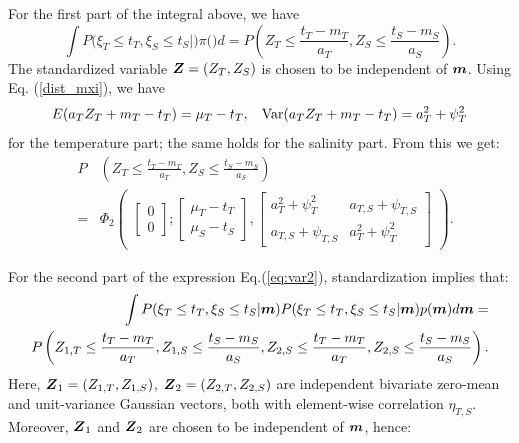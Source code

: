 \documentclass[aoas]{imsart}
\begin{document}
For the first part of the integral above, we have
\begin{equation}\label{part1:phi2}
 \int P(\xi_T \leq t_T, \xi_S \leq t_S|\bm) \pi(\bm) d\bm= 
P \left( Z_{T} \leq \frac{t_T-m_{T}}{a_{T}}, 
Z_{S} \leq \frac{t_S-m_{S}}{a_{S}} \right). \nonumber
\end{equation}
The standardized variable ${\boldsymbol Z}=(Z_{T},Z_{S})$ is chosen to be independent of ${\boldsymbol m}$. Using Eq. (\ref{dist_mxi}), we have
\begin{equation}
    E(a_{T} Z_{T}+m_{T}-t_T) = \mu_{T}-t_T, \hspace{3mm}
    \mbox{Var}(a_{T} Z_{T}+m_{T}-t_T) = a^2_T+ \psi^2_{T} 
\end{equation}
for the temperature part; the same holds for the salinity part. From this we get:
\begin{eqnarray}\label{two_parts0}
& P & \left( Z_{T} \leq \frac{t_T-m_{T}}{a_{T}}, 
Z_{S} \leq \frac{t_S-m_{S}}{a_{S}} \right) \\
&=& \Phi_2 \begin{pmatrix} 
\begin{bmatrix} 0\\
0
\end{bmatrix};
\begin{bmatrix} \mu_{T}-t_T\\
\mu_{S}-t_S
\end{bmatrix},\begin{bmatrix}
a^2_T+ \psi^2_{T} & a_{T,S}+\psi_{T,S}  \\
a_{T,S}+\psi_{T,S}   & a^2_T+ \psi^2_{T} 
\end{bmatrix}\end{pmatrix} \nonumber.
\end{eqnarray}

For the second part of the expression Eq.(\ref{eq:var2}), standardization
implies that: 
\begin{eqnarray}\label{part1:phi4}
&& \hspace{6mm} \int P(\xi_T \leq t_T, \xi_S \leq t_S|\bm) P(\xi_T \leq t_T, \xi_S \leq t_S|\bm) p(\bm) d\bm =  \\
&P& \hspace{-3mm} \left( Z_{1,T} \leq \frac{t_T-m_{T}}{a_{T}}, 
Z_{1,S} \leq \frac{t_S-m_{S}}{a_{S}},Z_{2,S} \leq \frac{t_T-m_{T}}{a_{T}}, 
Z_{2,S} \leq \frac{t_S-m_{S}}{a_{S}} \right). \nonumber
\end{eqnarray}
Here, ${\boldsymbol Z}_1=(Z_{1,T},Z_{1,S})$, ${\boldsymbol Z}_2=(Z_{2,T},Z_{2,S})$ are
independent bivariate zero-mean and unit-variance Gaussian vectors,
both with element-wise correlation $\eta_{T,S}$. Moreover, ${\boldsymbol Z}_1$ and
${\boldsymbol Z}_2$ are chosen to be independent of ${\boldsymbol m}$, hence:
\end{document}
